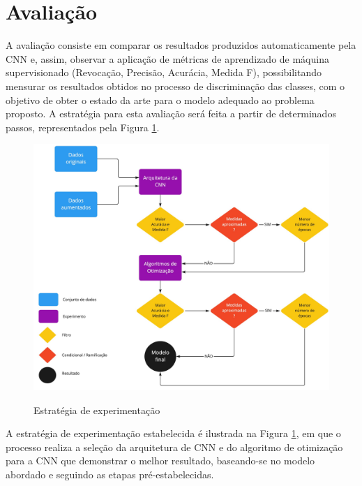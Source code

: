 \documentclass[
	12pt,				%
	oneside,			%
	a4paper,			%
	english,			%
	brazil				%
	]{abntex2ppgsi}
\begin{document}
\section{Avaliação}
\label{sec:avaliacao}
A avaliação consiste em comparar os resultados produzidos automaticamente pela CNN e, assim, observar a aplicação de métricas de aprendizado de máquina supervisionado (Revocação, Precisão, Acurácia, Medida F), possibilitando mensurar os resultados obtidos no processo de discriminação das classes, com o objetivo de obter o estado da arte para o modelo adequado ao problema proposto. A estratégia para esta avaliação será feita a partir de determinados passos, representados pela Figura \ref{fig:estrategia_experimentacao}.

\begin{figure}[H]
    \centering
    \caption{Estratégia de experimentação}
    \includegraphics[scale=.18]{imagens/materiais_metodos/avaliacao/estrategia_experimentacao.jpg}
    \label{fig:estrategia_experimentacao}
\end{figure}

A estratégia de experimentação estabelecida é ilustrada na Figura \ref{fig:estrategia_experimentacao}, em que o processo realiza a seleção da arquitetura de CNN e do algoritmo de otimização para a CNN que demonstrar o melhor resultado, baseando-se no modelo abordado e seguindo as etapas pré-estabelecidas.
\end{document}
